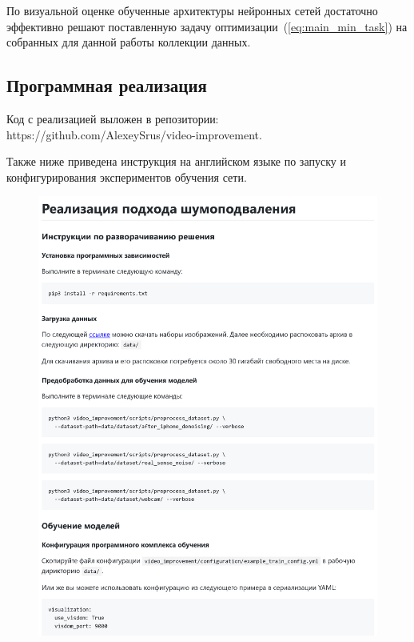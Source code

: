 \documentclass[14pt]{mmcs_article}
\begin{document}
По визуальной оценке обученные архитектуры нейронных сетей достаточно эффективно решают поставленную задачу оптимизации~(\ref{eq:main_min_task}) на собранных для данной работы коллекции данных.

\newpage


\printbibliography[%
heading=bibintoc%
]

\newpage
\begin{appendices}
	
\section{Программная реализация}


Код с реализацией выложен в репозитории: \\https://github.com/AlexeySrus/video-improvement. 

Также ниже приведена инструкция на английском языке по запуску и конфигурирования  экспериментов обучения сети.


\begin{figure}[h]
	\centering
	\includegraphics[width=\textwidth]{img/markdown/README_1}
	\label{fig:markdown_1}
\end{figure}


\end{appendices}
\end{document}
